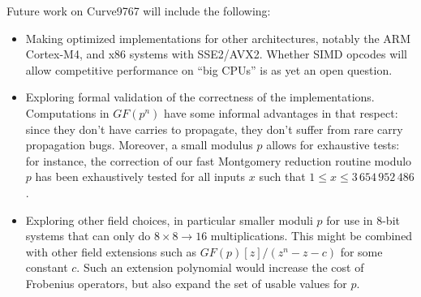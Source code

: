 \documentclass{llncs}
\newcommand{\GF}{GF}
\begin{document}
Future work on Curve9767 will include the following:
\begin{itemize}

    \item Making optimized implementations for other architectures,
    notably the ARM Cortex-M4, and x86 systems with SSE2/AVX2. Whether
    SIMD opcodes will allow competitive performance on ``big CPUs'' is
    as yet an open question.

    \item Exploring formal validation of the correctness of the
    implementations. Computations in $\GF(p^n)$ have some informal
    advantages in that respect: since they don't have carries to
    propagate, they don't suffer from rare carry propagation bugs.
    Moreover, a small modulus $p$ allows for exhaustive tests: for
    instance, the correction of our fast Montgomery reduction routine
    modulo $p$ has been exhaustively tested for all inputs $x$ such that
    $1\leq x\leq 3\,654\,952\,486$.

    \item Exploring other field choices, in particular smaller moduli
    $p$ for use in 8-bit systems that can only do $8\times 8\rightarrow
    16$ multiplications. This might be combined with other field
    extensions such as $\GF(p)[z]/(z^n-z-c)$ for some constant $c$. Such
    an extension polynomial would increase the cost of Frobenius
    operators, but also expand the set of usable values for $p$.

\end{itemize}
\end{document}
